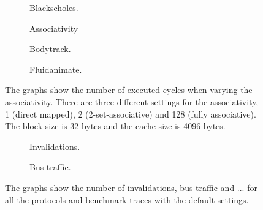 \begin{figure}[H]
    \centering
    \begin{subfigure}[b]{0.33\textwidth}
        \centering
        \caption{Blackscholes.}\label{fig:associativity_blackscholes_advanced}
    \end{subfigure}%
    \hfill
    \begin{subfigure}[b]{0.33\textwidth}
        \centering
        Associativity\par\medskip
        \caption{Bodytrack.}\label{fig:associativity_bodytrack_advanced}
    \end{subfigure}%
    \hfill
    \begin{subfigure}[b]{0.33\textwidth}
        \centering
        \caption{Fluidanimate.}\label{fig:associativity_fluidanimate_advanced}
    \end{subfigure}
    \hfill
    \caption{The graphs show the number of executed cycles when varying the associativity. There are three different settings for the associativity, 1 (direct mapped), 2 (2-set-associative) and 128 (fully associative). The block size is 32 bytes and the cache size is 4096 bytes.}\label{fig:associativity_advanced}
\end{figure}

\begin{figure}[H]
    \centering
    \begin{subfigure}[b]{0.33\textwidth}
        \centering
        \caption{Invalidations.}\label{fig:invalidations}
    \end{subfigure}%
    \hfill
    \begin{subfigure}[b]{0.33\textwidth}
        \centering
        \caption{Bus traffic.}\label{fig:bus_traffic}
    \end{subfigure}%
    \hfill
    \begin{subfigure}[b]{0.33\textwidth}
        \centering
        \caption{}\label{fig:}
    \end{subfigure}
    \hfill
    \caption{The graphs show the number of invalidations, bus traffic and ... for all the protocols and benchmark traces with the default settings.}\label{fig:}
\end{figure}
